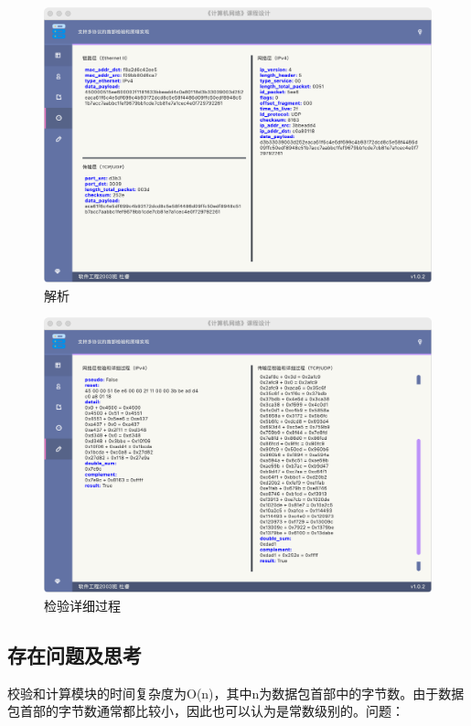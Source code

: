\documentclass[a4paper,11pt]{article}
\begin{document}
\begin{spacing}{1.2}
\begin{CJK}{UTF8}{gbsn}
\begin{figure}[htbp]
    \centering
    \includegraphics[scale=0.23]{index-par.png}
    \caption{解析}
\end{figure}

\begin{figure}[htbp]
    \centering
    \includegraphics[scale=0.23]{index-calc.png}
    \caption{检验详细过程}
\end{figure}

\subsection{存在问题及思考}

\noindent 校验和计算模块的时间复杂度为O(n)，其中n为数据包首部中的字节数。由于数据包首部的字节数通常都比较小，因此也可以认为是常数级别的。问题：


\end{CJK}
\end{spacing}
\end{document}
